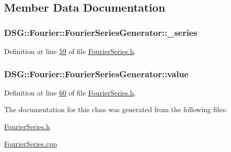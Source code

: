 \subsection{Member Data Documentation}
\hypertarget{class_d_s_g_1_1_fourier_1_1_fourier_series_generator_ac66c0907c6daa57f0e33f6b82cc7131d}{
\subsubsection[{\+\_\+series}]{ D\+S\+G\+::\+Fourier\+::\+Fourier\+Series\+Generator\+::\+\_\+series\hspace{0.3cm}{\ttfamily [protected]}}}\label{class_d_s_g_1_1_fourier_1_1_fourier_series_generator_ac66c0907c6daa57f0e33f6b82cc7131d}


Definition at line \hyperlink{_fourier_series_8h_source_l00059}{59} of file \hyperlink{_fourier_series_8h_source}{Fourier\+Series.\+h}.

\hypertarget{class_d_s_g_1_1_fourier_1_1_fourier_series_generator_a1785e78e21decfc65f650a5e3a435ed8}{
\subsubsection[{value}]{ D\+S\+G\+::\+Fourier\+::\+Fourier\+Series\+Generator\+::value\hspace{0.3cm}{\ttfamily [protected]}}}\label{class_d_s_g_1_1_fourier_1_1_fourier_series_generator_a1785e78e21decfc65f650a5e3a435ed8}


Definition at line \hyperlink{_fourier_series_8h_source_l00060}{60} of file \hyperlink{_fourier_series_8h_source}{Fourier\+Series.\+h}.



The documentation for this class was generated from the following files\+:\begin{DoxyCompactItemize}
\item 
\hyperlink{_fourier_series_8h}{Fourier\+Series.\+h}\item 
\hyperlink{_fourier_series_8cpp}{Fourier\+Series.\+cpp}\end{DoxyCompactItemize}
